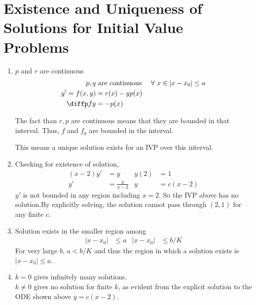\section{Existence and Uniqueness of Solutions for Initial Value Problems}

\begin{enumerate}
    \item $ p $ and $ r $ are continuous
          \begin{align}
              p,q          & \text{ are continuous } & \forall\ x & \in |x - x_{0}| \leq a \\
              y' = f(x, y) & = r(x) - yp(x)                                                \\
              \diffp fy    & = -p(x)
          \end{align}

          The fact than $ r,p $ are continuous means that they are bounded in that interval.
          Thus, $ f $ and $ f_{y} $ are bounded in the interval.

          This means a unique solution exists for an IVP over this interval.

    \item Checking for existence of solution,
          \begin{align}
              (x-2)y' & = y             & y(2) & = 1      \\
              y'      & = \frac{y}{x-2} & y    & = c(x-2)
          \end{align}
          $ y' $ is not bounded in any region including $ x = 2 $. So the IVP above has no
          solution.By explicitly solving, the solution cannot pass through $ (2, 1) $ for
          any finite $ c $.

    \item Solution exists in the smaller region among
          \begin{align}
              |x - x_{0}| & \leq a & |x - x_{0}| & \leq b/K
          \end{align}
          For very large $ b $, $ a < b/K $ and thus the region in which a solution exists
          is $ |x - x_{0}| \leq a $.

    \item $ k = 0 $ gives infinitely many solutions. \\
          $ k \neq 0 $ gives no solution for finite $ k $, as evident from the explicit
          solution to the ODE shown above $ y = c(x-2) $.


\end{enumerate}
